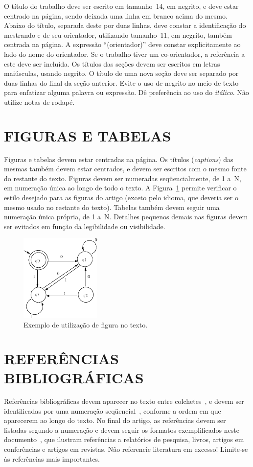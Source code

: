 \documentclass{sa}
\begin{document}
O título do trabalho deve ser escrito em tamanho~14, em negrito, e deve 
estar centrado na página, sendo deixada uma linha em branco acima do mesmo. 
Abaixo do título, separada deste por duas linhas, deve constar a identificação 
do mestrando e de seu orientador, utilizando tamanho~11, em negrito, também 
centrada na página. A expressão ``(orientador)'' deve constar explicitamente 
ao lado do nome do orientador. Se o trabalho tiver um co-orientador, a 
referência a este deve ser incluída. Os títulos das seções devem ser escritos 
em letras maiúsculas, usando negrito. O título de uma nova seção deve ser 
separado por duas linhas do final da seção anterior. Evite o uso de negrito 
no meio de texto para enfatizar alguma palavra ou expressão. 
Dê preferência ao uso do \emph{itálico}. Não utilize notas de rodapé.
\section{FIGURAS E TABELAS}
Figuras e tabelas devem estar centradas na página. Os títulos (\emph{captions}) 
das mesmas também devem estar centrados, e devem ser escritos com o mesmo 
fonte do restante do texto. Figuras devem ser numeradas seqüencialmente, de 
1 a~N, em numeração única ao longo de todo o texto. A Figura~\ref{fig} permite 
verificar o estilo desejado para as figuras do artigo (exceto pelo idioma, 
que deveria ser o mesmo usado no restante do texto). Tabelas também devem 
seguir uma numeração única própria, de 1 a~N\@. Detalhes pequenos demais nas 
figuras devem ser evitados em função da legibilidade ou visibilidade.

\begin{figure}
	\centerline{\includegraphics[width=4cm]{fig.eps}}
	\caption{Exemplo de utilização de figura no texto.}
	\label{fig}
\end{figure}

\section{REFERÊNCIAS BIBLIOGRÁFICAS}
Referências bibliográficas devem aparecer no texto entre colchetes~\cite{chu}, e 
devem ser identificadas por uma numeração seqüencial~\cite{wagner}, conforme a 
ordem em que aparecerem ao longo do texto. No final do artigo, as referências 
devem ser listadas segundo a numeração e devem seguir os formatos 
exemplificados neste documento~\cite{chu}, que ilustram referências a 
relatórios de pesquisa, livros, artigos em conferências e artigos em revistas. 
Não referencie literatura em excesso! Limite-se às referências mais importantes.
\end{document}
